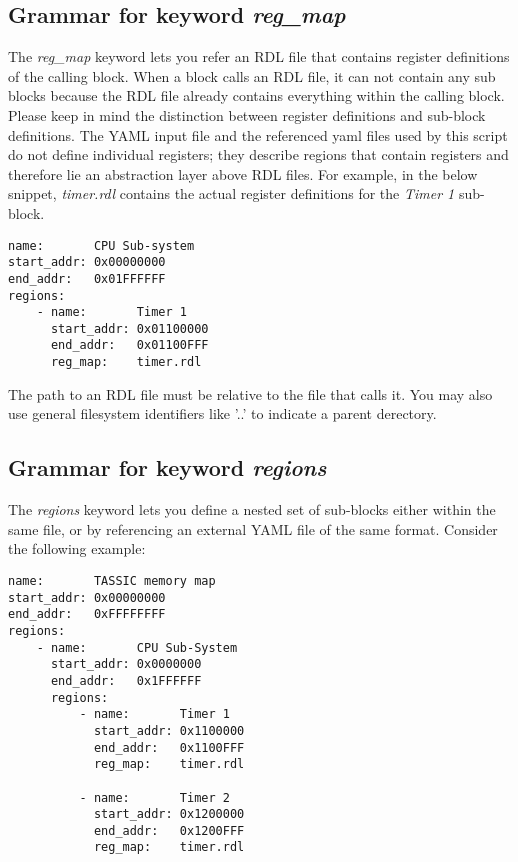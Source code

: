 \documentclass{tropic_design_spec}
\begin{document}
\subsection{Grammar for keyword \textit{reg_map}}
The \textit{reg_map} keyword lets you refer an RDL file that contains register definitions
of the calling block. When a block calls an RDL file, it can not contain any sub blocks
because the RDL file already contains everything within the calling block.
\newline
Please keep in mind the distinction between register definitions and sub-block definitions.
The YAML input file and the referenced yaml files used by this script do not define individual 
registers; they describe regions that contain registers and therefore lie an abstraction layer
above RDL files.
\newline
For example, in the below snippet, \textit{timer.rdl} contains the actual register definitions
for the \textit{Timer 1} sub-block.

\begin{lstlisting}
name:       CPU Sub-system
start_addr: 0x00000000
end_addr:   0x01FFFFFF
regions:
    - name:       Timer 1
      start_addr: 0x01100000
      end_addr:   0x01100FFF
      reg_map:    timer.rdl
\end{lstlisting}

The path to an RDL file must be relative to the file that calls it. You may also use general
filesystem identifiers like '..' to indicate a parent derectory.

\pagebreak
\subsection{Grammar for keyword \textit{regions}}
The \textit{regions} keyword lets you define a nested set of sub-blocks either within the
same file, or by referencing an external YAML file of the same format. Consider the following 
example:

\begin{lstlisting}
name:       TASSIC memory map
start_addr: 0x00000000
end_addr:   0xFFFFFFFF
regions:
    - name:       CPU Sub-System
      start_addr: 0x0000000
      end_addr:   0x1FFFFFF
      regions:
          - name:       Timer 1
            start_addr: 0x1100000
            end_addr:   0x1100FFF
            reg_map:    timer.rdl

          - name:       Timer 2
            start_addr: 0x1200000
            end_addr:   0x1200FFF
            reg_map:    timer.rdl
\end{lstlisting}
\end{document}
